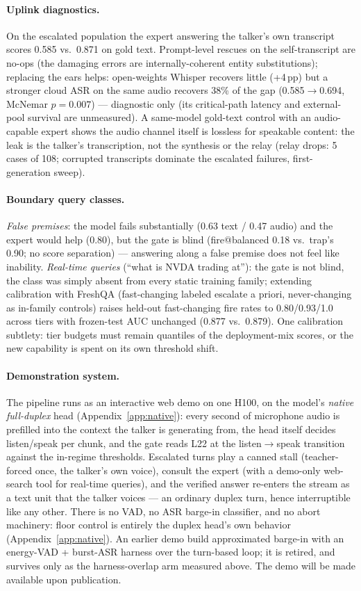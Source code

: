 \paragraph{Uplink diagnostics.} On the escalated population the expert
answering the talker's own transcript scores 0.585 vs.\ 0.871 on gold
text. Prompt-level rescues on the self-transcript are no-ops (the
damaging errors are internally-coherent entity substitutions);
replacing the ears helps: open-weights Whisper recovers little
(+4\,pp) but a stronger cloud ASR on the same audio recovers 38\% of
the gap (0.585$\to$0.694, McNemar $p{=}0.007$) --- diagnostic only (its
critical-path latency and external-pool survival are unmeasured). A
same-model gold-text control with an audio-capable expert shows the
audio channel itself is lossless for speakable content: the leak is
the talker's transcription, not the synthesis or the relay (relay
drops: 5 cases of 108; corrupted transcripts dominate the escalated
failures, first-generation sweep).

\paragraph{Boundary query classes.} \emph{False premises}: the model
fails substantially (0.63 text / 0.47 audio) and the expert would help
(0.80), but the gate is blind (fire@balanced 0.18 vs.\ trap's 0.90; no
score separation) --- answering along a false premise does not feel
like inability. \emph{Real-time queries} (``what is NVDA trading at''):
the gate is not blind, the class was simply absent from every static
training family; extending calibration with FreshQA
\citep{vu2023freshllms} (fast-changing labeled escalate a priori,
never-changing as in-family controls) raises held-out fast-changing
fire rates to 0.80/0.93/1.0 across tiers with frozen-test AUC unchanged
(0.877 vs.\ 0.879). One calibration subtlety: tier budgets must remain
quantiles of the deployment-mix scores, or the new capability is
spent on its own threshold shift.

\paragraph{Demonstration system.} The pipeline runs as an interactive
web demo on one H100, on the model's \emph{native full-duplex} head
(Appendix~\ref{app:native}): every second of microphone audio is
prefilled into the context the talker is generating from, the head
itself decides listen/speak per chunk, and the gate reads L22 at the
listen$\to$speak transition against the in-regime thresholds.
Escalated turns play a canned stall (teacher-forced once, the talker's
own voice), consult the expert (with a demo-only web-search tool for
real-time queries), and the verified answer re-enters the stream as a
text unit that the talker voices --- an ordinary duplex turn, hence
interruptible like any other. There is no VAD, no ASR barge-in
classifier, and no abort machinery: floor control is entirely the
duplex head's own behavior (Appendix~\ref{app:native}). An earlier
demo build approximated barge-in with an energy-VAD + burst-ASR
harness over the turn-based loop; it is retired, and survives only as
the harness-overlap arm measured above. The demo will be made
available upon publication.

